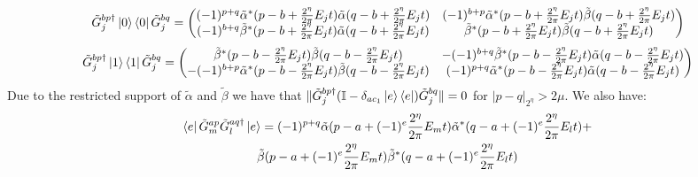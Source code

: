 \documentclass[aps,floatfix,10pt,amssymb,amsfont,amsmath,superscriptaddress,float,nofootinbib,longbibliography,nobalancelastpage,twocolumn]{revtex4-2}
\begin{document}
\begin{widetext}
\begin{equation}
    \tilde G^{bp\dagger}_{j}\ket{0}\bra{0} \tilde G^{bq}_{j} = \begin{pmatrix}
        (-1)^{p+q}\tilde \alpha^*(p-b+\frac{2^{\eta}}{2\pi}E_{j}t)\tilde  \alpha(q-b+\frac{2^{\eta}}{2\pi}E_{j}t) &(-1)^{b+p}\tilde  \alpha^*(p-b+\frac{2^{\eta}}{2\pi}E_{j}t)\tilde  \beta(q-b+\frac{2^{\eta}}{2\pi}E_{j}t)  \\(-1)^{b+q}\tilde  \beta^*(p-b+\frac{2^{\eta}}{2\pi}E_{j}t)\tilde  \alpha(q-b+\frac{2^{\eta}}{2\pi}E_{j}t) & \tilde  \beta^*(p-b+\frac{2^{\eta}}{2\pi}E_{j}t)\tilde  \beta(q-b+\frac{2^{\eta}}{2\pi}E_{j}t)
    \end{pmatrix}
\end{equation} 
\begin{equation}
    \tilde G^{bp\dagger}_{j}\ket{1}\bra{1} \tilde G^{bq}_{j} = \begin{pmatrix}
        \tilde \beta^*(p-b-\frac{2^{\eta}}{2\pi}E_{j}t)\tilde  \beta(q-b-\frac{2^{\eta}}{2\pi}E_{j}t) &  -(-1)^{b+q}\tilde  \beta^*(p-b-\frac{2^{\eta}}{2\pi}E_{j}t)\tilde \alpha(q-b-\frac{2^{\eta}}{2\pi}E_{j}t) \\
        -(-1)^{b+p}\tilde  \alpha^*(p-b-\frac{2^{\eta}}{2\pi}E_{j}t)\tilde  \beta(q-b-\frac{2^{\eta}}{2\pi}E_{j}t) & (-1)^{p+q}\tilde  \alpha^*(p-b-\frac{2^{\eta}}{2\pi}E_{j}t)\tilde \alpha(q-b-\frac{2^{\eta}}{2\pi}E_{j}t)
    \end{pmatrix}
\end{equation} 
Due to the restricted support of $\tilde \alpha$ and $\tilde \beta$ we have that $\|\tilde G^{bp\dagger}_{j}(\mathbb{I} - \delta_{ac_1}\ket{e}\bra{e})\tilde G^{bq}_{j}\| = 0$ for $|p-q|_{2^{\eta}} > 2\mu$. We also have:
\begin{multline}
    \bra{e}\tilde G^{ap}_m\tilde G^{aq\dagger}_l\ket{e} = (-1)^{p+q}\tilde \alpha(p - a + (-1)^e\frac{2^{\eta}}{2\pi}E_{m}t)\tilde  \alpha^*(q - a + (-1)^e\frac{2^{\eta}}{2\pi}E_{l}t) +\\ \tilde \beta(p - a + (-1)^e\frac{2^{\eta}}{2\pi}E_{m}t)\tilde  \beta^*(q - a + (-1)^e\frac{2^{\eta}}{2\pi}E_{l}t)

\end{multline}
\end{widetext}
\end{document}
